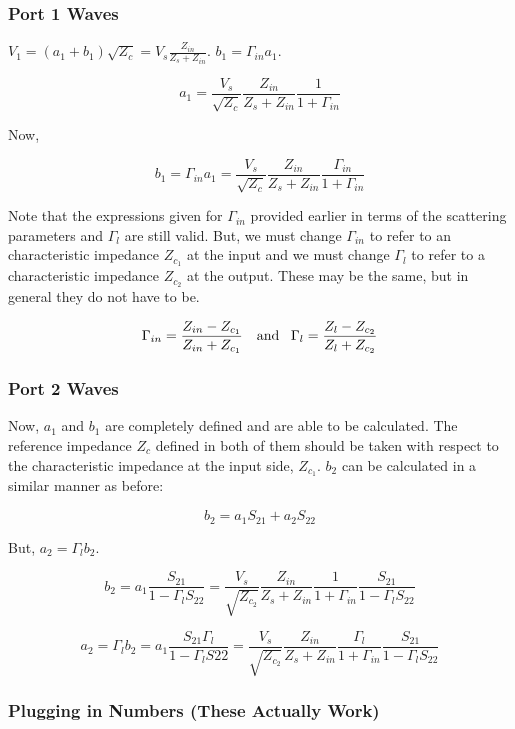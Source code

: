 \subsubsection{Port 1 Waves}
$V_1 = (a_1 + b_1)\sqrt{Z_c} = V_s \frac{Z_{in}}{Z_s + Z_{in}}$. $b_1 =
\Gamma_{in} a_1$.

\[ 
        a_1 = \frac{V_s}{\sqrt{Z_c}} \frac{Z_{in}}{Z_s + Z_{in}} \frac{1}{1+\Gamma_{in}} 
\]

Now,

\[ 
        b_1 = \Gamma_{in} a_1 = \frac{V_s}{\sqrt{Z_c}} \frac{Z_{in}}{Z_s +
        Z_{in}} \frac{\Gamma_{in}}{1+ \Gamma_{in}} 
\]

Note that the expressions given for $\Gamma_{in}$ provided earlier in terms of
the scattering parameters and $\Gamma_l$ are still valid. But, we must change
$\Gamma_{in}$ to refer to an characteristic impedance $Z_{c_1}$ at the input and we must
change $\Gamma_l$ to refer to a characteristic impedance $Z_{c_2}$ at the
output. These may be the same, but in general they do not have to be.

\[ 
        \Gamma_{in} = \frac{Z_{in}-Z_{c_1}}{Z_{in}+Z_{c_1}} \text{\quad and
        \enskip} \Gamma_{l} = \frac{Z_{l}-Z_{c_2}}{Z_{l}+Z_{c_2}} 
\]

\subsubsection{Port 2 Waves}
Now, $a_1$ and $b_1$ are completely defined and are able to be calculated. The
reference impedance $Z_c$ defined in both of them should be taken with respect
to the characteristic impedance at the input side, $Z_{c_1}$. $b_2$ can be
calculated in a similar manner as before:

\[ 
        b_2 = a_1 S_{21} + a_2 S_{22}
\]

But, $a_2 = \Gamma_l b_2$.

\[ 
        b_2 = a_1 \frac{S_{21}}{1-\Gamma_l S_{22}}  = \frac{V_s}{\sqrt{Z_{c_2}}}
        \frac{Z_{in}}{Z_s + Z_{in}} \frac{1}{1+\Gamma_{in}}
    \frac{S_{21}}{1-\Gamma_l S_{22}}
\]

\[ 
        a_2 = \Gamma_l b_2 = a_1\frac{S_{21}\Gamma_l}{1-\Gamma_l S{22}}  =  \frac{V_s}{\sqrt{Z_{c_2}}}
        \frac{Z_{in}}{Z_s + Z_{in}} \frac{\Gamma_l}{1+\Gamma_{in}}
    \frac{S_{21}}{1-\Gamma_l S_{22}}
\]

\subsubsection{Plugging in Numbers (These Actually Work)}


